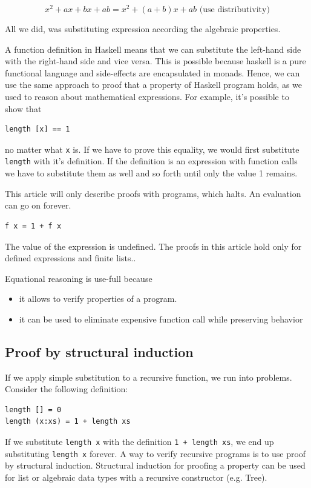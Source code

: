 \begin{equation}
x^2 + ax + bx + ab = x^2 + (a + b)x + ab \text{     (use distributivity)}
\end{equation}

All we did, was substituting expression according the algebraic properties.

A function definition in Haskell means that we can substitute the left-hand side with the right-hand side and vice versa. This is possible because haskell is a pure functional language and side-effects are encapsulated in monads. Hence, we can use the same approach to proof that a property of Haskell program holds, as we used to reason about mathematical expressions. 
For example, it's possible to show that 
\begin{verbatim}
length [x] == 1
\end{verbatim}
no matter what \verb|x| is. If we have to prove this equality, we would first substitute \verb|length| with it's definition. If the definition is an expression with function calls we have to substitute them as well and so forth until only the value 1 remains.

This article will only describe proofs with programs, which halts. An evaluation can go on forever.
\begin{verbatim}
f x = 1 + f x
\end{verbatim}

The value of the expression is undefined. The proofs in this article hold only for defined expressions and finite lists..

Equational reasoning is use-full because
\begin{itemize}
\item it allows to verify properties of a program.
\item it can be used to eliminate expensive function call while preserving behavior
\end{itemize}

\subsection{Proof by structural induction}
\label{sec:induction}

If we apply simple substitution to a recursive function, we run into problems.
Consider the following definition:
\begin{verbatim}
length [] = 0
length (x:xs) = 1 + length xs
\end{verbatim}
If we substitute \verb|length x| with the definition \verb|1 + length xs|, we end up substituting \verb|length x| forever. A way to verify recursive programs is to use proof by structural induction.  
Structural induction for proofing a property can be used for list or algebraic data types with a recursive constructor (e.g. Tree).

